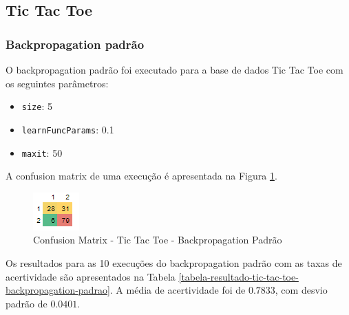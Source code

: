 \subsection{Tic Tac Toe}

\subsubsection{Backpropagation padrão}

O backpropagation padrão foi executado para a base de dados Tic Tac Toe com os seguintes parâmetros:

\begin{itemize}
	\item \texttt{size}: 5
	\item \texttt{learnFuncParams}: 0.1
	\item \texttt{maxit}: 50
\end{itemize}

A confusion matrix de uma execução é apresentada na Figura \ref{figura-confusion-matrix-tic-tac-toe-backpropagation-padrao}.

\begin{figure}[h!]
  \centering
  \includegraphics[width=0.3\linewidth]{figs/confusion-matrix-tic-tac-toe-backpropagation-padrao.png}
  \caption{Confusion Matrix - Tic Tac Toe - Backpropagation Padrão}
  \label{figura-confusion-matrix-tic-tac-toe-backpropagation-padrao}
\end{figure}

Os resultados para as 10 execuções do backpropagation padrão com as taxas de acertividade são apresentados na Tabela \ref{tabela-resultado-tic-tac-toe-backpropagation-padrao}. A média de acertividade foi de $0.7833$, com desvio padrão de $0.0401$.

